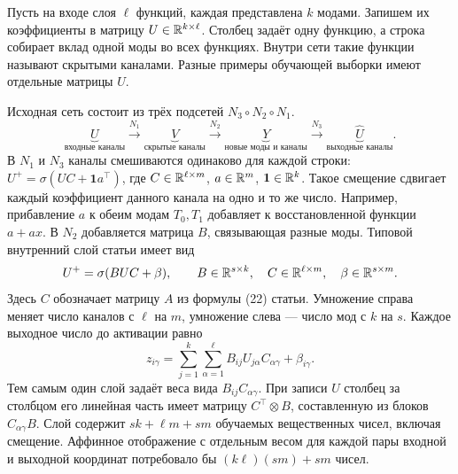 Пусть на входе слоя $\ell$ функций, каждая представлена $k$ модами.
Запишем их коэффициенты в матрицу $U\in\mathbb{R}^{k\times\ell}$.
Столбец задаёт одну функцию, а строка собирает вклад одной моды во
всех функциях. Внутри сети такие функции называют скрытыми каналами.
Разные примеры обучающей выборки имеют отдельные матрицы $U$.

Исходная сеть состоит из трёх подсетей $N_3\circ N_2\circ N_1$.
\[
 \underbrace{U}_{\text{входные каналы}}
 \xrightarrow{N_1}
 \underbrace{V}_{\text{скрытые каналы}}
 \xrightarrow{N_2}
 \underbrace{Y}_{\text{новые моды и каналы}}
 \xrightarrow{N_3}
 \underbrace{\widehat U}_{\text{выходные каналы}} .
\]
В $N_1$ и $N_3$ каналы смешиваются одинаково для каждой строки:
$U^+=\sigma(UC+\bm 1 a^\top)$, где
$C\in\mathbb{R}^{\ell\times m}$, $a\in\mathbb{R}^m$, $\bm 1\in\mathbb{R}^k$.
Такое смещение сдвигает каждый коэффициент данного канала на одно и то же число.
Например, прибавление $a$ к обеим модам $T_0,T_1$ добавляет к
восстановленной функции $a+ax$. В $N_2$ добавляется матрица $B$,
связывающая разные моды. Типовой
внутренний слой статьи имеет вид
\begin{equation}
 U^+=\sigma(BUC+\beta),\qquad
 B\in\mathbb{R}^{s\times k},\quad
 C\in\mathbb{R}^{\ell\times m},\quad
 \beta\in\mathbb{R}^{s\times m}.
 \label{sno:paper22}
\end{equation}
Здесь $C$ обозначает матрицу $A$ из формулы (22) статьи.
Умножение справа меняет число каналов с $\ell$ на $m$,
умножение слева --- число мод с $k$ на $s$.
Каждое выходное число до активации равно
\[
 z_{i\gamma}=\sum_{j=1}^k\sum_{\alpha=1}^{\ell}
         B_{ij}U_{j\alpha}C_{\alpha\gamma}+\beta_{i\gamma}.
\]
Тем самым один слой задаёт веса вида $B_{ij}C_{\alpha\gamma}$.
При записи $U$ столбец за столбцом его линейная часть имеет матрицу
$C^\top\otimes B$, составленную из блоков $C_{\alpha\gamma}B$.
Слой содержит $sk+\ell m+sm$ обучаемых вещественных чисел, включая
смещение. Аффинное отображение с отдельным весом для каждой пары
входной и выходной координат потребовало бы $(k\ell)(sm)+sm$ чисел.

